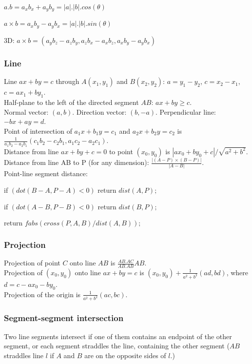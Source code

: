 \documentclass[a4paper,13pt]{article}
\begin{document}
\bigskip

$a . b = a_{x}b_{x} + a_{y}b_{y} = |a| . |b| . cos(\theta)$

$a \times b = a_{x}b_{y} - a_{y}b_{x} = |a| . |b| . sin(\theta)$

3D: $a \times b = (a_{y}b_{z} - a_{z}b_{y}, a_{z}b_{x} - a_{x}b_{z}, a_{x}b_{y} - a_{y}b_{x})$

\subsubsection{Line}
Line $ax + by = c$ through $A(x_{1}, y_{1})$ and $B(x_{2}, y_{2})$: $a = y_{1} - y_{2}$, $c = x_{2} - x_{1}$, $c = ax_{1} + by_{1}$.\\
Half-plane to the left of the directed segment $AB$: $ax + by \geq c$.\\
Normal vector: $(a, b)$. Direction vector: $(b, -a)$. Perpendicular line: $-bx + ay = d$.\\
Point of intersection of $a_{1}x + b_{1}y = c_{1}$ and $a_{2}x + b_{2}y = c_{2}$ is $\frac{1}{a_{1}b_{2} - a_{2}b_{1}}(c_{1}b_{2} - c_{2}b_{1}, a_{1}c_{2} - a_{2}c_{1})$.\\
Distance from line $ax + by + c = 0$ to point $(x_{0}, y_{0})$ is $|ax_{0} + by_{0} + c|/\sqrt{a^2 + b^2}$.\\
Distance from line AB to P (for any dimension): $\frac{|(A - P) \times (B - P)|}{|A - B|}$.\\
Point-line segment distance:

if $(dot(B - A, P - A) < 0)$ return $dist(A, P);$

if $(dot(A - B, P - B) < 0)$ return $dist(B, P);$

return $fabs(cross(P, A, B)/dist(A, B));$

\subsubsection{Projection}
Projection of point $C$ onto line $AB$ is $\frac{AB.AC}{AB.AB}AB$.\\
Projection of $(x_{0}, y_{0})$ onto line $ax + by = c$ is $(x_{0}, y_{0}) + \frac{1}{a^2 + b^2}(ad, bd)$, where $d = c - ax_{0} - by_{0}$.\\
Projection of the origin is $\frac{1}{a^2 + b^2}(ac, bc)$.

\subsubsection{Segment-segment intersection}
Two line segments intersect if one of them contains an endpoint of the other segment, or each segment straddles the line, containing the other segment ($AB$ straddles line $l$ if $A$ and $B$ are on the opposite sides of $l$.)
\end{document}
